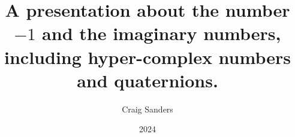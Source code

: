 \documentclass[t]{beamer}
\title{A presentation about the number \(-1\) and the imaginary numbers, including hyper-complex numbers and quaternions.}
\author{Craig Sanders}
\institute{Gravitas Toolworks}
\date{2024}
\begin{document}

\frame{\titlepage}







% 
\end{document}
